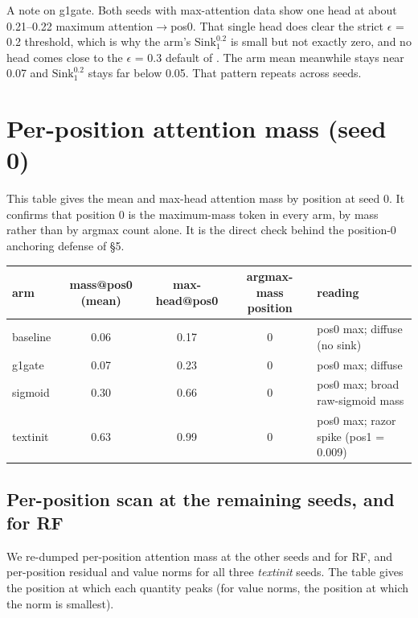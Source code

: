 \documentclass{article}
\begin{document}
A note on g1gate. Both seeds with max-attention data show one head at about 0.21--0.22 maximum attention$\rightarrow$pos0. That single head does clear the strict $\epsilon$ = 0.2 threshold, which is why the arm's $\mathrm{Sink}^{0.2}_{1}$ is small but not exactly zero, and no head comes close to the $\epsilon$ = 0.3 default of \cite{ref6}. The arm mean meanwhile stays near 0.07 and $\mathrm{Sink}^{0.2}_{1}$ stays far below 0.05. That pattern repeats across seeds.

\section{Per-position attention mass (seed 0)}

This table gives the mean and max-head attention mass by position at seed 0. It confirms that position 0 is the maximum-mass token in every arm, by mass rather than by argmax count alone. It is the direct check behind the position-0 anchoring defense of \S5.

\begin{table}[t]
  \centering
  \small
  \begin{tabularx}{\linewidth}{lcccX}
    \toprule
    arm & mass@pos0 (mean) & max-head@pos0 & argmax-mass position & reading \\
    \midrule
    baseline & 0.06 & 0.17 & 0 & pos0 max; diffuse (no sink) \\
    g1gate & 0.07 & 0.23 & 0 & pos0 max; diffuse \\
    sigmoid & 0.30 & 0.66 & 0 & pos0 max; broad raw-sigmoid mass \\
    textinit & 0.63 & 0.99 & 0 & pos0 max; razor spike (pos1 = 0.009) \\
    \bottomrule
  \end{tabularx}
\end{table}

\subsection{Per-position scan at the remaining seeds, and for RF}

We re-dumped per-position attention mass at the other seeds and for RF, and per-position residual and value norms for all three \textit{textinit} seeds. The table gives the position at which each quantity peaks (for value norms, the position at which the norm is smallest).
\end{document}
